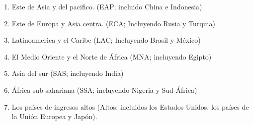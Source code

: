\begin{multicols}{2}
    \begin{enumerate}[\bfseries (i)]

	\item Este de Asia y del pacifico. (EAP; incluido China e Indonesia)
	\item Este de Europa y Asia centra. (ECA; Incluyendo Rusia y Turquia)
	\item Latinoamerica y el Caribe (LAC; Incluyendo Brasil y México)
	\item El Medio Oriente y el Norte de África (MNA; incluyendo Egipto)
	\item Asia del sur (SAS; incluyendo India)
	\item África sub-sahariana (SSA; incluyendo Nigeria y Sud-África) 
	\item Los países de ingresos altos (Altos; incluidos los Estados Unidos, los países de la Unión Europea y Japón).\\

    \end{enumerate}



\end{multicols}
